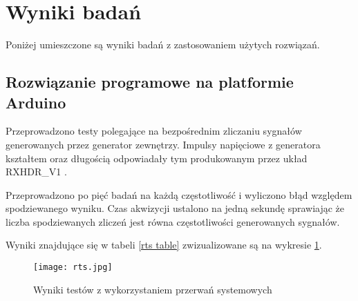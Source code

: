 \section{Wyniki badań}

Poniżej umieszczone są wyniki badań z zastosowaniem użytych rozwiązań. 

\subsection{Rozwiązanie programowe na platformie Arduino}

Przeprowadzono testy polegające na bezpośrednim zliczaniu sygnałów generowanych przez generator zewnętrzy. 
Impulsy napięciowe z generatora kształtem oraz długością odpowiadały tym produkowanym przez układ RXHDR\_V1 \cite{master}.

Przeprowadzono po pięć badań na każdą częstotliwość i wyliczono błąd względem spodziewanego wyniku. 
Czas akwizycji ustalono na jedną sekundę sprawiając że liczba spodziewanych zliczeń jest równa częstotliwości generowanych sygnałów.

Wyniki znajdujące się w tabeli \ref{rts table} zwizualizowane są na wykresie \ref{rts wyniki}.


\begin{figure}[b]
        \centering
        \texttt{[image: rts.jpg]}
        \caption{Wyniki testów z wykorzystaniem przerwań systemowych}
        \label{rts wyniki}
\end{figure}

